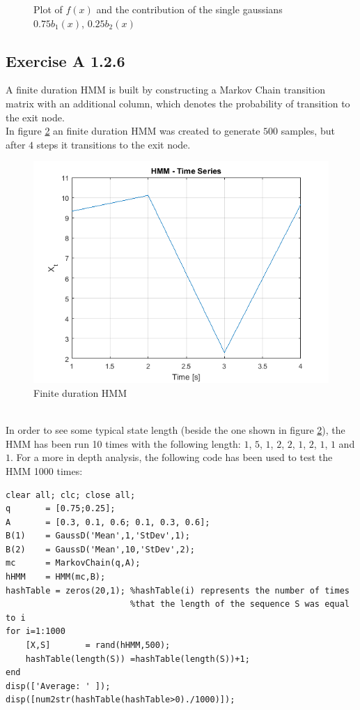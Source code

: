 \documentclass[10pt,a4paper,final]{article}
\begin{document}
\begin{figure}[h]
\centering
{}
 \caption{Plot of $f(x)$ and the contribution of the single gaussians $0.75b_1(x)$, $0.25b_2(x)$}	
 \label{fig:f2}
\end{figure}
\newpage
\subsection{Exercise A 1.2.6}
A finite duration HMM is built by constructing a Markov Chain transition matrix with an additional column, which denotes the probability of transition to the exit node.
\\ In figure \ref{fig:A5} an finite duration HMM was created to generate $500$ samples, but after $4$ steps it transitions to the exit node.
\begin{figure}[h]
		\centering	\includegraphics[width=0.55\linewidth]{./images/A5.png}
		\caption{Finite duration HMM}
		\label{fig:A5}	
\end{figure}\\
In order to see some typical state length (beside the one shown in figure \ref{fig:A5}), the HMM has been run 10 times with the following length: $1$, $5$, $1$, $2$, $2$, $1$, $2$, $1$, $1$ and $1$.
For a more in depth analysis, the following code has been used to test the HMM 1000 times:
\begin{lstlisting}
clear all; clc; close all;
q       = [0.75;0.25];
A       = [0.3, 0.1, 0.6; 0.1, 0.3, 0.6];
B(1)    = GaussD('Mean',1,'StDev',1);
B(2)    = GaussD('Mean',10,'StDev',2);
mc      = MarkovChain(q,A);
hHMM    = HMM(mc,B);
hashTable = zeros(20,1); %hashTable(i) represents the number of times 
						 %that the length of the sequence S was equal to i
for i=1:1000
    [X,S]       = rand(hHMM,500);
    hashTable(length(S)) =hashTable(length(S))+1;
end
disp(['Average: ' ]);
disp([num2str(hashTable(hashTable>0)./1000)]);
\end{lstlisting}
\end{document}
